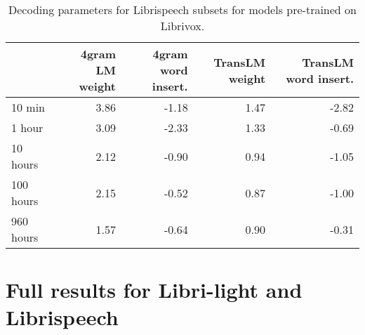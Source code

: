 \documentclass{article}
\newcommand{\libri}{Librispeech}
\newcommand{\libril}{Libri-light}
\begin{document}
\begin{table}[ht!]
\caption{Decoding parameters for \libri{} subsets for models pre-trained on Librivox.
}
\label{tbl:decoding-params-vox}
\centering 
\begin{tabular}{lrrrr}
\toprule
{} & 4gram LM weight & 4gram word insert. & TransLM weight & TransLM word insert. \\
\midrule
10 min & 3.86 & -1.18 & 1.47 & -2.82 \\
1 hour & 3.09 & -2.33 & 1.33 & -0.69 \\
10 hours & 2.12 & -0.90  & 0.94 & -1.05 \\
100 hours & 2.15 & -0.52 & 0.87 & -1.00 \\
960 hours & 1.57 & -0.64 & 0.90 & -0.31 \\
\bottomrule
\end{tabular}
\end{table}


\newpage
\section{Full results for \libril{} and \libri{}}
\label{app:libri}
\end{document}
